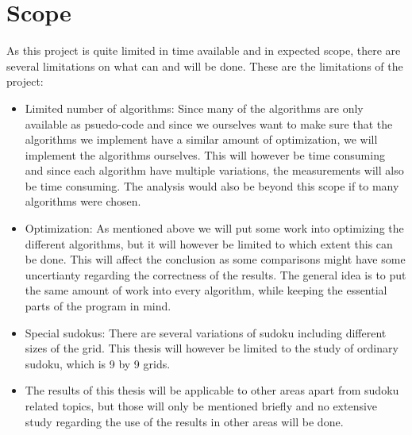 \documentclass[a4paper,11pt]{kth-mag}
\begin{document}
\section{Scope}
As this project is quite limited in time available and in expected scope, 
there are several limitations on what can and will be done. 
These are the limitations of the project:
\begin{itemize}
    \item Limited number of algorithms: Since many of the algorithms are only available as psuedo-code and since we ourselves want to make sure that the algorithms we implement have a similar amount of optimization, we will implement the algorithms ourselves. This will however be time consuming and since each algorithm have multiple variations, the measurements will also be time consuming. The analysis would also be beyond this scope if to many algorithms were chosen.
    \item Optimization: As mentioned above we will put some work into optimizing the different algorithms, but it will however be limited to which extent this can be done. This will affect the conclusion as some comparisons might have some uncertianty regarding the correctness of the results. The general idea is to put the same amount of work into every algorithm, while keeping the essential parts of the program in mind.
    \item Special sudokus: There are several variations of sudoku including different sizes of the grid. This thesis will however be limited to the study of ordinary sudoku, which is 9 by 9 grids.
    \item The results of this thesis will be applicable to other areas apart from sudoku related topics, but those will only be mentioned briefly and no extensive study regarding the use of the results in other areas will be done. 
\end{itemize}
\end{document}
